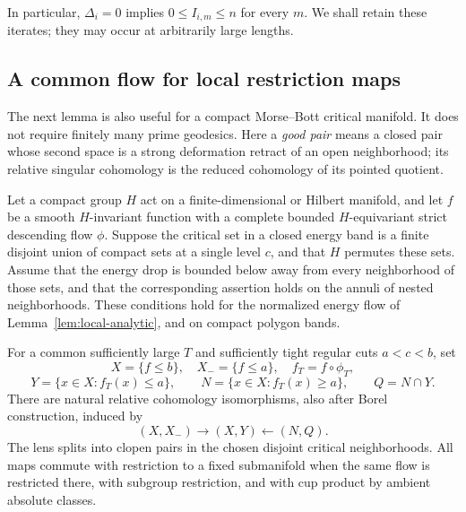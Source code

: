 In particular, \(\Delta_i=0\) implies \(0\le I_{i,m}\le n\) for
every \(m\).  We shall retain these iterates; they may occur at
arbitrarily large lengths.

\subsection{A common flow for local restriction maps}

The next lemma is also useful for a compact Morse--Bott critical
manifold.  It does not require finitely many prime geodesics.
Here a \emph{good pair} means a closed pair whose second space
is a strong deformation retract of an open neighborhood; its
relative singular cohomology is the reduced cohomology of its
pointed quotient.

\begin{lemma}\label{lem:local-lens}
Let a compact group \(H\) act on a finite-dimensional or Hilbert
manifold, and let \(f\) be a smooth \(H\)-invariant function with a
complete bounded \(H\)-equivariant strict descending flow \(\phi\).
Suppose the critical set
in a closed energy band is a finite disjoint union of compact
sets at a single level \(c\), and that \(H\) permutes these sets.
Assume that the energy drop is
bounded below away from every neighborhood of those sets, and
that the corresponding assertion holds on the annuli of nested
neighborhoods.  These conditions hold for the normalized energy
flow of Lemma~\ref{lem:local-analytic}, and on compact polygon
bands.

For a common sufficiently large \(T\) and sufficiently tight
regular cuts \(a<c<b\), set
\[
 X=\{f\le b\},\quad X_-=\{f\le a\},\quad f_T=f\circ\phi_T,
\]
\begin{equation}\label{eq:local-lens}
 Y=\{x\in X:f_T(x)\le a\},\qquad
 N=\{x\in X:f_T(x)\ge a\},\qquad Q=N\cap Y.
\end{equation}
There are natural relative cohomology isomorphisms, also after
Borel construction, induced by
\begin{equation}\label{eq:local-lens-maps}
 (X,X_-)\longrightarrow(X,Y)\longleftarrow(N,Q).
\end{equation}
The lens splits into clopen pairs in the chosen disjoint critical
neighborhoods.  All maps commute with restriction to a fixed
submanifold when the same flow is restricted there, with subgroup
restriction, and with cup product by ambient absolute classes.
\end{lemma}

